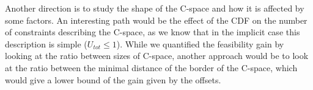 \documentclass[conference]{IEEEtran}
\begin{document}

Another direction is to study the shape of the C-space and how it is affected by some factors. An
interesting path would be the effect of the CDF on the number of constraints describing the C-space,
as we know that in the implicit case this description is simple ($U_{tot} \leqslant 1$). While we
quantified the feasibility gain by looking at the ratio between sizes of C-space, another approach
would be to look at the ratio between the minimal distance of the border of the C-space, which would
give a lower bound of the gain given by the offsets.









%
%
%




\end{document}
